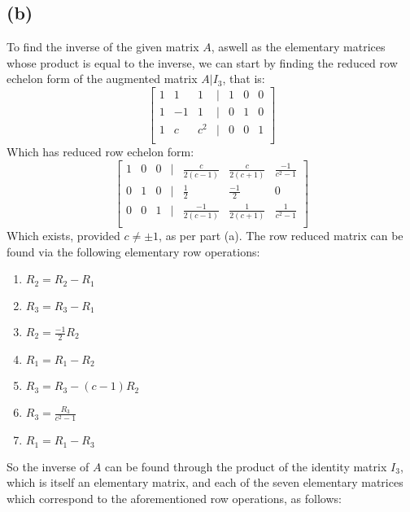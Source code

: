 \documentclass[11pt]{article}
\begin{document}
\subsection*{(b)}
To find the inverse of the given matrix $A$, aswell as the elementary matrices whose product is equal to the inverse, we can start by finding the reduced row echelon form of the augmented matrix $A|I_3$, that is:
$$\begin{bmatrix}
1 & 1 & 1 & | & 1 & 0 & 0\\
1 & -1 & 1 & | & 0 & 1 & 0\\
1 & c & c^2 & | & 0 & 0 & 1\\
\end{bmatrix}$$
Which has reduced row echelon form:
$$\begin{bmatrix}
1 & 0 & 0 & | & \frac{c}{2(c-1)} & \frac{c}{2(c+1)} & \frac{-1}{c^2-1}\\
0 & 1 & 0 & | & \frac{1}{2} & \frac{-1}{2} & 0\\
0 & 0 & 1 & | & \frac{-1}{2(c-1)} & \frac{1}{2(c+1)} & \frac{1}{c^2-1}\\
\end{bmatrix}$$
Which exists, provided $c\neq \pm 1$, as per part (a). The row reduced matrix can be found via the following elementary row operations:
\begin{enumerate}
\item $R_2=R_2-R_1$
\item $R_3 = R_3 - R_1$
\item $R_2 = \frac{-1}{2}R_2$
\item $R_1=R_1-R_2$
\item $R_3=R_3-(c-1)R_2$
\item $R_3=\frac{R_3}{c^2-1}$
\item $R_1 = R_1 - R_3$
\end{enumerate}  
So the inverse of $A$ can be found through the product of the identity matrix $I_3$, which is itself an elementary matrix, and each of the seven elementary matrices which correspond to the aforementioned row operations, as follows:
\end{document}
